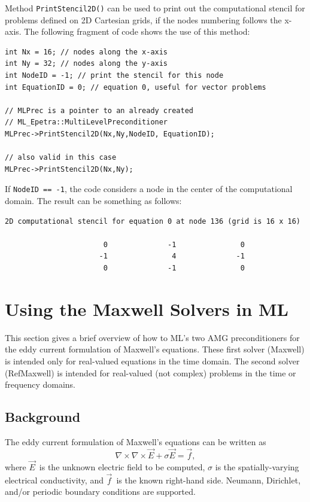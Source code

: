 \documentclass{article}[11pt]
\newcommand{\ML}     {{\bf ML}}
\begin{document}
Method \verb!PrintStencil2D()! can be used to print out the computational
stencil for problems defined on 2D Cartesian grids, if the nodes numbering
follows the x-axis. The following fragment of code shows the use of this
method:
\begin{verbatim}
int Nx = 16; // nodes along the x-axis
int Ny = 32; // nodes along the y-axis
int NodeID = -1; // print the stencil for this node
int EquationID = 0; // equation 0, useful for vector problems

// MLPrec is a pointer to an already created 
// ML_Epetra::MultiLevelPreconditioner
MLPrec->PrintStencil2D(Nx,Ny,NodeID, EquationID);

// also valid in this case
MLPrec->PrintStencil2D(Nx,Ny);
\end{verbatim}
If \verb!NodeID == -1!, the code considers a node in the center of the
computational domain. The result can be something as follows:
\begin{verbatim}
2D computational stencil for equation 0 at node 136 (grid is 16 x 16)

                       0              -1               0
                      -1               4              -1
                       0              -1               0
\end{verbatim}

\clearpage
\newpage

\section{Using the Maxwell Solvers in \ML} \label{maxwell solver}
%
This section gives a brief overview of how to ML's two AMG preconditioners for
the eddy current formulation of Maxwell's equations.
These first solver (Maxwell) is intended only for real-valued
equations in the time domain.  The second solver (RefMaxwell) is intended for
real-valued (not complex) problems in the time or frequency domains.


\subsection{Background}\label{maxwell background}
The eddy current formulation of Maxwell's equations can be written as
\begin{equation} \label{maxwell pde}
\nabla\times\nabla\times \vec{E} + \sigma \vec{E} = \vec{f},
\end{equation}
where
$\vec{E}$\ is the unknown electric field to be computed,
$\sigma$ is the spatially-varying electrical conductivity,
and $\vec{f}$\ is the known right-hand side.
Neumann, Dirichlet, and/or periodic boundary conditions are supported.
\end{document}
